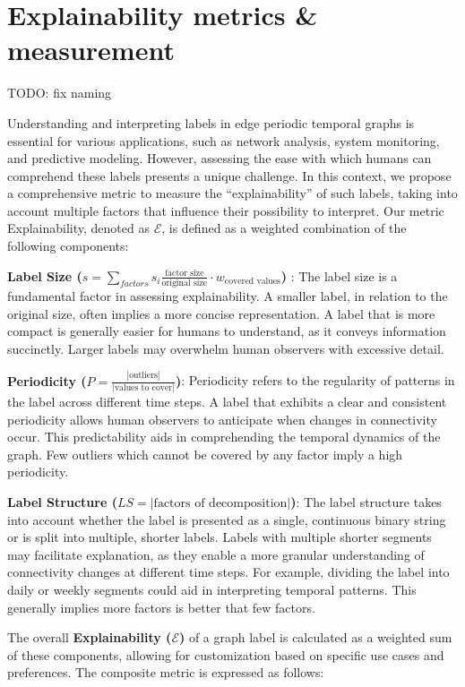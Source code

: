 \chapter{Explainability metrics \& measurement}
TODO: fix naming


Understanding and interpreting labels in edge periodic temporal graphs is essential for various applications, such as network analysis, system monitoring, and predictive modeling. However, assessing the ease with which humans can comprehend these labels presents a unique challenge. In this context, we propose a comprehensive metric to measure the \enquote{explainability} of such labels, taking into account multiple factors that influence their possibility to interpret. Our metric Explainability, denoted as $\mathcal{E}$, is defined as a weighted combination of the following components:

\textbf{Label Size ($s = \sum_{factors} s_i \frac{\text{factor size}}{\text{original size}} \cdot w_\text{covered values}$) }: The label size is a fundamental factor in assessing explainability. A smaller label, in relation to the original size, often implies a more concise representation. A label that is more compact is generally easier for humans to understand, as it conveys information succinctly. Larger labels may overwhelm human observers with excessive detail.

\textbf{Periodicity ($P = \frac{|\text{outliers}|}{|\text{values to cover}|}$)}: Periodicity refers to the regularity of patterns in the label across different time steps. A label that exhibits a clear and consistent periodicity allows human observers to anticipate when changes in connectivity occur. This predictability aids in comprehending the temporal dynamics of the graph. Few outliers which cannot be covered by any factor imply a high periodicity.

\textbf{Label Structure ($LS = |\text{factors of decomposition}|$)}: The label structure takes into account whether the label is presented as a single, continuous binary string or is split into multiple, shorter labels. Labels with multiple shorter segments may facilitate explanation, as they enable a more granular understanding of connectivity changes at different time steps. For example, dividing the label into daily or weekly segments could aid in interpreting temporal patterns. This generally implies more factors is better that few factors.

The overall \textbf{Explainability ($\mathcal{E}$)} of a graph label is calculated as a weighted sum of these components, allowing for customization based on specific use cases and preferences. The composite metric is expressed as follows:

